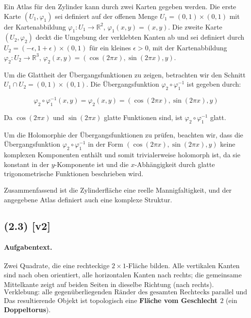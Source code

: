\documentclass[11pt,a4paper]{article}
\begin{document}
Ein Atlas für den Zylinder kann durch zwei Karten gegeben werden. Die erste Karte \((U_1, \varphi_1)\) sei definiert auf der offenen Menge \(U_1 = (0,1) \times (0,1)\) mit der Kartenabbildung \(\varphi_1: U_1 \to \mathbb{R}^2\), \(\varphi_1(x,y) = (x,y)\). Die zweite Karte \((U_2, \varphi_2)\) deckt die Umgebung der verklebten Kanten ab und sei definiert durch \(U_2 = (-\epsilon, 1+\epsilon) \times (0,1)\) für ein kleines \(\epsilon > 0\), mit der Kartenabbildung \(\varphi_2: U_2 \to \mathbb{R}^3\), \(\varphi_2(x,y) = (\cos(2\pi x), \sin(2\pi x), y)\).

Um die Glattheit der Übergangsfunktionen zu zeigen, betrachten wir den Schnitt \(U_1 \cap U_2 = (0,1) \times (0,1)\). Die Übergangsfunktion \(\varphi_2 \circ \varphi_1^{-1}\) ist gegeben durch:

\[
\varphi_2 \circ \varphi_1^{-1}(x,y) = \varphi_2(x,y) = (\cos(2\pi x), \sin(2\pi x), y)
\]

Da \(\cos(2\pi x)\) und \(\sin(2\pi x)\) glatte Funktionen sind, ist \(\varphi_2 \circ \varphi_1^{-1}\) glatt.

Um die Holomorphie der Übergangsfunktionen zu prüfen, beachten wir, dass die Übergangsfunktion \(\varphi_2 \circ \varphi_1^{-1}\) in der Form \((\cos(2\pi x), \sin(2\pi x), y)\) keine komplexen Komponenten enthält und somit trivialerweise holomorph ist, da sie konstant in der \(y\)-Komponente ist und die \(x\)-Abhängigkeit durch glatte trigonometrische Funktionen beschrieben wird.

Zusammenfassend ist die Zylinderfläche eine reelle Mannigfaltigkeit, und der angegebene Atlas definiert auch eine komplexe Struktur.


\subsection*{(2.3) [v2]}
\paragraph{Aufgabentext.}
Zwei Quadrate, die eine rechteckige $2\times1$-Fläche bilden.  
Alle vertikalen Kanten sind nach oben orientiert, 
alle horizontalen Kanten nach rechts; 
die gemeinsame Mittelkante zeigt auf beiden Seiten in dieselbe Richtung (nach rechts).  
\[
\text{Verklebung: alle gegenüberliegenden Ränder des gesamten Rechtecks parallel und gleich orientiert.}
\]
Das resultierende Objekt ist topologisch eine \textbf{Fläche vom Geschlecht $2$} (ein \textbf{Doppeltorus}).
\end{document}
